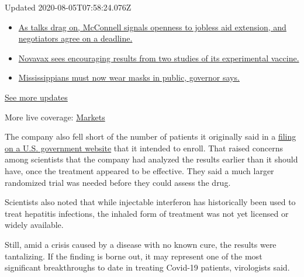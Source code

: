 Updated 2020-08-05T07:58:24.076Z

\begin{itemize}
\tightlist
\item
  \href{https://www.nytimes.com/2020/08/04/world/coronavirus-cases.html?action=click\&pgtype=Article\&state=default\&region=MAIN_CONTENT_1\&context=storylines_live_updates\#link-762df92}{As
  talks drag on, McConnell signals openness to jobless aid extension,
  and negotiators agree on a deadline.}
\item
  \href{https://www.nytimes.com/2020/08/04/world/coronavirus-cases.html?action=click\&pgtype=Article\&state=default\&region=MAIN_CONTENT_1\&context=storylines_live_updates\#link-1228a480}{Novavax
  sees encouraging results from two studies of its experimental
  vaccine.}
\item
  \href{https://www.nytimes.com/2020/08/04/world/coronavirus-cases.html?action=click\&pgtype=Article\&state=default\&region=MAIN_CONTENT_1\&context=storylines_live_updates\#link-794484ed}{Mississippians
  must now wear masks in public, governor says.}
\end{itemize}

\href{https://www.nytimes.com/2020/08/04/world/coronavirus-cases.html?action=click\&pgtype=Article\&state=default\&region=MAIN_CONTENT_1\&context=storylines_live_updates}{See
more updates}

More live coverage:
\href{https://www.nytimes.com/live/2020/08/04/business/stock-market-today-coronavirus?action=click\&pgtype=Article\&state=default\&region=MAIN_CONTENT_1\&context=storylines_live_updates}{Markets}

The company also fell short of the number of patients it originally said
in a
\href{https://clinicaltrials.gov/ct2/show/record/NCT04385095?term=interferon\&cond=covid-19\&draw=2\&view=record}{filing
on a U.S. government website} that it intended to enroll. That raised
concerns among scientists that the company had analyzed the results
earlier than it should have, once the treatment appeared to be
effective. They said a much larger randomized trial was needed before
they could assess the drug.

Scientists also noted that while injectable interferon has historically
been used to treat hepatitis infections, the inhaled form of treatment
was not yet licensed or widely available.

Still, amid a crisis caused by a disease with no known cure, the results
were tantalizing. If the finding is borne out, it may represent one of
the most significant breakthroughs to date in treating Covid-19
patients, virologists said.

